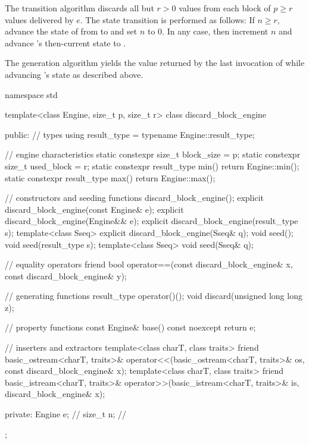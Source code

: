 \pnum
The transition algorithm
discards all but $r > 0$ values
from each block of $p \geq r$ values delivered by $e$.
The state transition is performed as follows:
If $n \geq r$,
 advance the state of  from  to 
 and set $n$ to $0$.
In any case,
 then increment $n$
 and advance 's then-current state 
 to .

\pnum
The generation algorithm
yields the value returned by the last invocation of 
 while advancing 's state as described above.

%
%
\begin{codeblock}
namespace std {
  template<class Engine, size_t p, size_t r>
  class discard_block_engine {
  public:
    // types
    using result_type = typename Engine::result_type;

    // engine characteristics
    static constexpr size_t block_size = p;
    static constexpr size_t used_block = r;
    static constexpr result_type min() { return Engine::min(); }
    static constexpr result_type max() { return Engine::max(); }

    // constructors and seeding functions
    discard_block_engine();
    explicit discard_block_engine(const Engine& e);
    explicit discard_block_engine(Engine&& e);
    explicit discard_block_engine(result_type s);
    template<class Sseq> explicit discard_block_engine(Sseq& q);
    void seed();
    void seed(result_type s);
    template<class Sseq> void seed(Sseq& q);

    // equality operators
    friend bool operator==(const discard_block_engine& x, const discard_block_engine& y);

    // generating functions
    result_type operator()();
    void discard(unsigned long long z);

    // property functions
    const Engine& base() const noexcept { return e; }

    // inserters and extractors
    template<class charT, class traits>
      friend basic_ostream<charT, traits>&
        operator<<(basic_ostream<charT, traits>& os, const discard_block_engine& x);
    template<class charT, class traits>
      friend basic_istream<charT, traits>&
        operator>>(basic_istream<charT, traits>& is, discard_block_engine& x);

  private:
    Engine e;   // \expos
    size_t n;   // \expos
  };
}
\end{codeblock}


